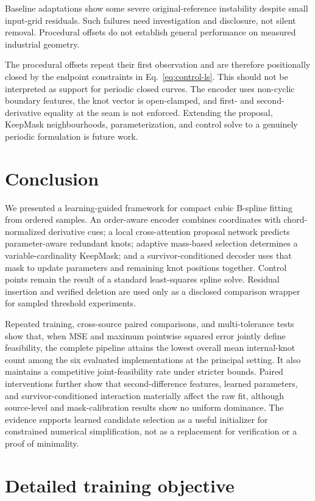\documentclass[preprint,12pt]{elsarticle}
\begin{document}
Baseline adaptations show some severe original-reference instability despite
small input-grid residuals. Such failures need investigation and disclosure,
not silent removal. Procedural offsets do not establish general performance
on measured industrial geometry.

The procedural offsets repeat their first observation and are therefore
positionally closed by the endpoint constraints in Eq.~\eqref{eq:control-ls}.
This should not be
interpreted as support for periodic closed curves. The encoder uses non-cyclic
boundary features, the knot vector is open-clamped, and first- and
second-derivative equality at the seam is not enforced. Extending the proposal,
KeepMask neighbourhoods, parameterization, and control solve to a genuinely
periodic formulation is future work.

\section{Conclusion}
We presented a learning-guided framework for compact cubic B-spline fitting
from ordered samples. An order-aware encoder combines coordinates with
chord-normalized derivative cues; a local cross-attention proposal network
predicts parameter-aware redundant knots; adaptive mass-based selection
determines a variable-cardinality KeepMask; and a survivor-conditioned decoder
uses that mask to update parameters and remaining knot positions together.
Control points remain the result of a standard least-squares spline solve.
Residual insertion and verified deletion are used only as a disclosed
comparison wrapper for sampled threshold experiments.

Repeated training, cross-source paired comparisons, and multi-tolerance tests
show that, when MSE and maximum pointwise squared error jointly define
feasibility, the complete pipeline attains the lowest overall mean
internal-knot count among the six evaluated implementations at the principal
setting. It also maintains a competitive joint-feasibility rate under stricter
bounds. Paired interventions further show that second-difference features,
learned parameters, and survivor-conditioned interaction materially affect
the raw fit, although source-level and mask-calibration results show no uniform
dominance. The evidence supports learned candidate selection as a useful
initializer for constrained numerical simplification, not as a replacement
for verification or a proof of minimality.

\appendix
\section{Detailed training objective}
\label{app:loss}

\end{document}
